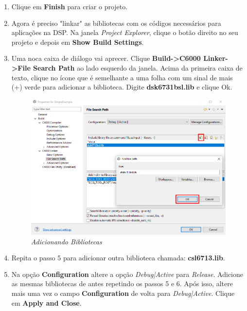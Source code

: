 \documentclass[a4paper, 12pt]{article}
\begin{document}
\begin{enumerate}
 \item Clique em \textbf{Finish} para criar o projeto.
 
 \item Agora é preciso "linkar" as bibliotecas com os códigos necessários para aplicações na DSP. Na janela \textit{Project Explorer}, clique o botão direito no seu projeto e depois em \textbf{Show Build Settings}.
 
 \item Uma noca caixa de diálogo vai aprecer. Clique \textbf{Build->C6000 Linker->File Search Path} ao lado esquerdo da janela. Acima da primeira caixa de texto, clique no ícone que é semelhante a uma folha com um sinal de mais (+) verde para adicionar a biblioteca. Digite \textbf{dsk6731bsl.lib} e clique Ok.
 
  \begin{figure}[htbp!] 
  	\begin{center}
  		\includegraphics[scale=0.5]{linker_bib.png}
  		\caption{\textit{Adicionando Bibliotecas}}
  		\label{Fig:dspbibs}
  	\end{center} 
  \end{figure}
  
  \item Repita o passo 5 para adicionar outra biblioteca chamada: \textbf{csl6713.lib}.
  
  \item Na opção \textbf{Configuration} altere a opção \textit{Debug|Active} para \textit{Release}. Adicione as mesmas bibliotecas de antes repetindo os passos 5 e 6. Após isso, altere mais uma vez o campo \textbf{Configuration} de volta para \textit{Debug|Active}. Clique em \textbf{Apply and Close}.


\end{enumerate}
\end{document}
